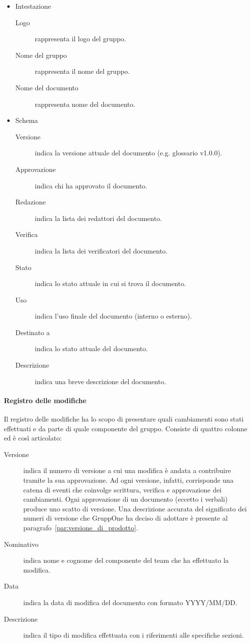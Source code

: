 \documentclass[../../norme-di-progetto.tex]{subfiles}
\begin{document}
\begin{itemize}
  \item Intestazione
        \begin{description}
          \item [Logo] rappresenta il logo del gruppo.
          \item [Nome del gruppo] rappresenta il nome del gruppo.
          \item [Nome del documento] rappresenta nome del documento.
        \end{description}
  \item Schema
        \begin{description}
          \item [Versione] indica la versione attuale del documento (e.g\@. glossario v1.0.0).
          \item [Approvazione] indica chi ha approvato il documento.
          \item [Redazione] indica la lista dei redattori del documento.
          \item [Verifica] indica la lista dei verificatori del documento.
          \item [Stato] indica lo stato attuale in cui si trova il documento.
          \item [Uso] indica l'uso finale del documento (interno o esterno).
          \item [Destinato a] indica lo stato attuale del documento.
          \item [Descrizione] indica una breve descrizione del documento.
        \end{description}
\end{itemize}

\paragraph{Registro delle modifiche}%
\label{par:registro_delle_modifiche}
Il registro delle modifiche ha lo scopo di presentare quali cambiamenti sono stati effettuati e da parte di quale componente del gruppo. Consiste di quattro colonne ed è così articolato:
\begin{description}
  \item [Versione] indica il numero di versione a cui una modifica è andata a contribuire tramite la sua approvazione.
        Ad ogni versione, infatti, corrisponde una catena di eventi che coinvolge scrittura, verifica e approvazione dei cambiamenti.
        Ogni approvazione di un documento (eccetto i verbali) produce uno scatto di versione.
        Una descrizione accurata del significato dei numeri di versione che GruppOne ha deciso di adottare è presente al paragrafo~\ref{par:versione_di_prodotto}.
  \item [Nominativo] indica nome e cognome del componente del team che ha effettuato la modifica.
  \item [Data] indica la data di modifica del documento con formato YYYY/MM/DD\@.
  \item [Descrizione] indica il tipo di modifica effettuata con i riferimenti alle specifiche sezioni.
\end{description}
\end{document}
